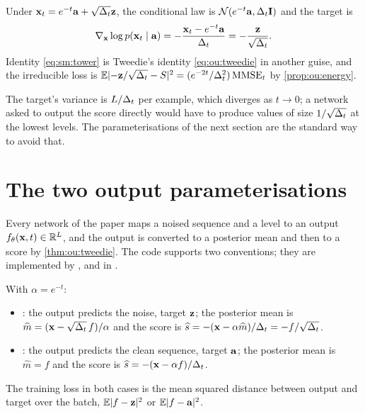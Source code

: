\begin{corollary}
\label{cor:sm:channel}
Under $\mathbf{x}_t=e^{-t}\mathbf{a}+\sqrt{\Delta_t}\mathbf{z}$, the conditional law is
$\mathcal{N}\!\left(e^{-t}\mathbf{a},\Delta_t\mathbf{I}\right)$ and the target is
\begin{equation}
  \nabla_{\mathbf{x}}\log p(\mathbf{x}_t\mid\mathbf{a})=-\frac{\mathbf{x}_t-e^{-t}\mathbf{a}}{\Delta_t}=-\frac{\mathbf{z}}{\sqrt{\Delta_t}} .
  \label{eq:sm:target}
\end{equation}
Identity \cref{eq:sm:tower} is Tweedie's identity \cref{eq:ou:tweedie} in another
guise, and the irreducible loss is
$\mathbb{E}|{-\mathbf{z}/\sqrt{\Delta_t}}-S|^2=(e^{-2t}/\Delta_t^2)\,\mathrm{MMSE}_t$ by
\cref{prop:ou:energy}.
\end{corollary}

The target's variance is $L/\Delta_t$ per example, which diverges as $t\to0$; a network
asked to output the score directly would have to produce values of size $1/\sqrt{\Delta_t}$
at the lowest levels. The parameterisations of the next section are the standard way to
avoid that.

\section{The two output parameterisations}
\label{sec:sm:param}

Every network of the paper maps a noised sequence and a level to an output
$f_\theta(\mathbf{x},t)\in\mathbb{R}^{L}$, and the output is converted to a posterior mean
and then to a score by \cref{thm:ou:tweedie}. The code supports two conventions;
they are implemented by , 
and  in .

\begin{definition}
\label{def:sm:param}
With $\alpha=e^{-t}$:
\begin{itemize}
\item {}: the output predicts the noise, target $\mathbf{z}$; the posterior mean is
  $\widehat m=(\mathbf{x}-\sqrt{\Delta_t}\,f)/\alpha$ and the score is
  $\widehat s=-(\mathbf{x}-\alpha\widehat m)/\Delta_t=-f/\sqrt{\Delta_t}$.
\item {}: the output predicts the clean sequence, target $\mathbf{a}$; the posterior
  mean is $\widehat m=f$ and the score is $\widehat s=-(\mathbf{x}-\alpha f)/\Delta_t$.
\end{itemize}
The training loss in both cases is the mean squared distance between output and
target over the batch, $\mathbb{E}|f-\mathbf{z}|^2$ or $\mathbb{E}|f-\mathbf{a}|^2$.
\end{definition}

